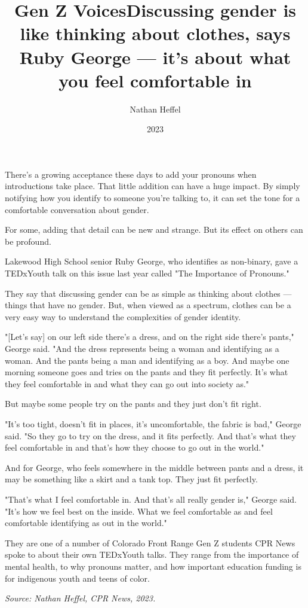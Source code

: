 \documentclass[10pt,a4paper]{article}
\newcommand{\subtitle}[1]{\vspace{10pt}\newline\normalsize\plantin #1}
\begin{document}
\title{Gen Z Voices\subtitle{Discussing gender is like thinking about clothes, says Ruby George — it's about what you feel comfortable in}
}
\date{2023}
\author{Nathan Heffel}

\maketitle

\noindent\linenumbers There's a growing acceptance these days to add your pronouns when introductions take place. That little addition can have a huge impact. By simply notifying how you identify to someone you're talking to, it can set the tone for a comfortable conversation about gender.

For some, adding that detail can be new and strange. But its effect on others can be profound.

Lakewood High School senior Ruby George, who identifies as non-binary, gave a TEDxYouth talk on this issue last year called "The Importance of Pronouns."

They say that discussing gender can be as simple as thinking about clothes — things that have no gender. But, when viewed as a spectrum, clothes can be a very easy way to understand the complexities of gender identity.

"[Let's say] on our left side there's a dress, and on the right side there's pants," George said. "And the dress represents being a woman and identifying as a woman. And the pants being a man and identifying as a boy. And maybe one morning someone goes and tries on the pants and they fit perfectly. It's what they feel comfortable in and what they can go out into society as."

But maybe some people try on the pants and they just don't fit right.

"It's too tight, doesn't fit in places, it's uncomfortable, the fabric is bad," George said. "So they go to try on the dress, and it fits perfectly. And that's what they feel comfortable in and that's how they choose to go out in the world."

And for George, who feels somewhere in the middle between pants and a dress, it may be something like a skirt and a tank top. They just fit perfectly.

"That's what I feel comfortable in. And that's all really gender is," George said. "It's how we feel best on the inside. What we feel comfortable as and feel comfortable identifying as out in the world."

They are one of a number of Colorado Front Range Gen Z students CPR News spoke to about their own TEDxYouth talks. They range from the importance of mental health, to why pronouns matter, and how important education funding is for indigenous youth and teens of color.

\bigskip
\noindent\textit{Source: Nathan Heffel, CPR News, 2023.}
\end{document}
